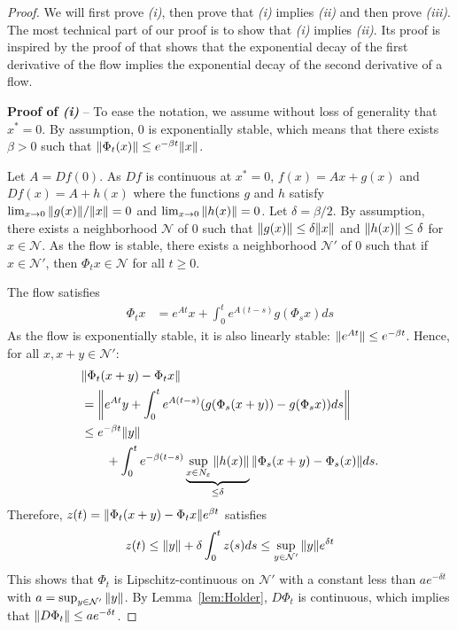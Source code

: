 \documentclass[acmlarge]{acmart}
\newcommand\calN{\mathcal{N}}
\newcommand\norm[1]{{\mathchoice{\bnorm{#1}}{\snorm{#1}}{\snorm{#1}}{\snorm{#1}}}}
\newcommand\bnorm[1]{\left\|#1\right\|}
\newcommand\snorm[1]{\|#1\|}
\begin{document}
\begin{proof}
  We will first prove \emph{(i)}, then prove that \emph{(i)} implies
  \emph{(ii)} and then prove \emph{(iii)}.  The most technical part of
  our proof is to show that \emph{(i)} implies \emph{(ii)}. Its proof
  is inspired by the proof of \cite[Lemma~C.1]{eldering2013normally}
  that shows that the exponential decay of the first derivative of
  the flow implies the exponential decay of the second derivative of a
  flow.
  
  \textbf{Proof of \emph{(i)}} -- To ease the notation, we assume
  without loss of generality that $x^*=0$. By assumption, $0$ is
  exponentially stable, which means that there exists $\beta>0$ such
  that $\norm{\Phi_t(x)}\le e^{-\beta t}\norm{x}$.

  Let $A=Df(0)$.  As $Df$ is continuous at $x^*=0$, $f(x)=Ax + g(x)$
  and $Df(x)=A+h(x)$ where the functions $g$ and $h$ satisfy
  $\lim_{x\to0}\norm{g(x)}/\norm{x}=0$ and
  $\lim_{x\to0}\norm{h(x)}=0$. Let $\delta=\beta/2$. By assumption,
  there exists a neighborhood $\calN$ of $0$ such that
  $\norm{g(x)}\le\delta\norm{x}$ and $\norm{h(x)}\le\delta$ for
  $x\in\calN$. As the flow is stable, there exists a neighborhood
  $\calN'$ of $0$ such that if $x\in\calN'$, then $\Phi_tx\in \calN$
  for all $t\ge0$.
  
  The flow satisfies
  \begin{align*}
    \Phi_tx &= e^{At}x + \int_0^t e^{A(t-s)} g(\Phi_sx)ds
  \end{align*}
  As the flow is exponentially stable, it is also linearly stable:
  $\norm{e^{At}}\le e^{-\beta t}$. Hence, for all $x,x+y\in\calN'$:
  \begin{align*}
    & \norm{\Phi_t(x+y) - \Phi_tx}\\
    &= \norm{e^{At}y + \int_0^t e^{A(t-s)}
      (g(\Phi_s(x+y))-g(\Phi_sx))ds}\\
    &\le e^{-\beta t}\norm{y} \\
    &\qquad+ \int_0^t
      e^{-\beta(t-s)} \underbrace{\sup_{x\in 
      N_\varepsilon}\norm{h(x)}}_{\le\delta}\norm{\Phi_s(x+y)-\Phi_s(x)}ds. 
  \end{align*}
  Therefore, $z(t)=\norm{\Phi_t(x+y)-\Phi_tx}e^{\beta t}$ satisfies
  \begin{align*}
    z(t)\le \norm{y} + \delta \int_0^t z(s)ds \le
    \sup_{y\in\calN'}\norm{y}e^{\delta t}
  \end{align*}
  This shows that $\Phi_t$ is Lipschitz-continuous on $\calN'$ with a
  constant less than $ae^{-\delta t}$ with
  $a=\sup_{y\in\calN'}\norm{y}$. By Lemma~\ref{lem:Holder}, $D\Phi_t$
  is continuous, which implies that
  $\norm{D\Phi_t}\le ae^{-\delta t}$. 
  

\end{proof}
\end{document}
